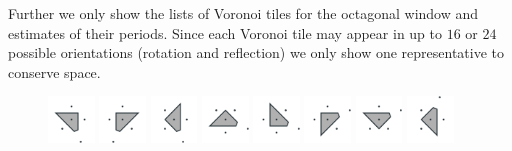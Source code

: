 \documentclass[text.tex]{subfiles}
\begin{document}
Further we only show the lists of Voronoi tiles for the octagonal window and estimates of their periods. Since each Voronoi tile may appear in up to $16$ or $24$ possible orientations (rotation and reflection) we only show one representative to conserve space.

\begin{figure}[h!]
\centering
\includegraphics[width=0.11\textwidth]{img/results/tiles/octagon_100000_(1_0alpha_1)_017.pdf}
\includegraphics[width=0.11\textwidth]{img/results/tiles/octagon_100000_(1_0alpha_1)_018.pdf}
\includegraphics[width=0.11\textwidth]{img/results/tiles/octagon_100000_(1_0alpha_1)_019.pdf}
\includegraphics[width=0.11\textwidth]{img/results/tiles/octagon_100000_(1_0alpha_1)_020.pdf}
\includegraphics[width=0.11\textwidth]{img/results/tiles/octagon_100000_(1_0alpha_1)_021.pdf}
\includegraphics[width=0.11\textwidth]{img/results/tiles/octagon_100000_(1_0alpha_1)_022.pdf}
\includegraphics[width=0.11\textwidth]{img/results/tiles/octagon_100000_(1_0alpha_1)_023.pdf}
\includegraphics[width=0.11\textwidth]{img/results/tiles/octagon_100000_(1_0alpha_1)_024.pdf}

\end{figure}
\end{document}
